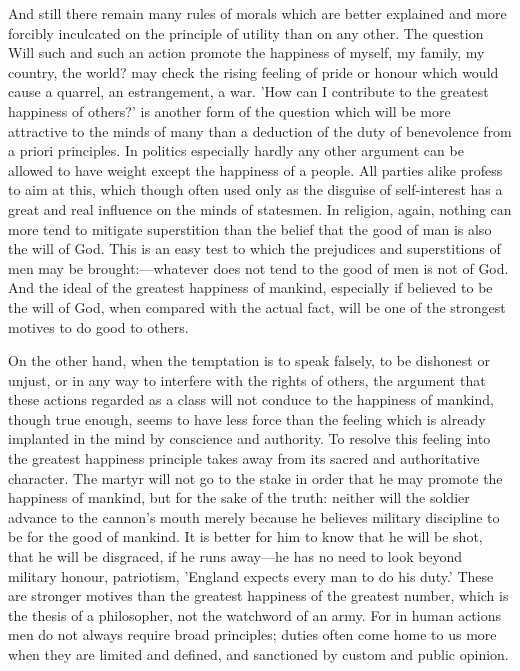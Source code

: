 \documentclass[11pt,letter]{article}
\begin{document}
\par  And still there remain many rules of morals which are better explained and more forcibly inculcated on the principle of utility than on any other. The question Will such and such an action promote the happiness of myself, my family, my country, the world? may check the rising feeling of pride or honour which would cause a quarrel, an estrangement, a war. 'How can I contribute to the greatest happiness of others?' is another form of the question which will be more attractive to the minds of many than a deduction of the duty of benevolence from a priori principles. In politics especially hardly any other argument can be allowed to have weight except the happiness of a people. All parties alike profess to aim at this, which though often used only as the disguise of self-interest has a great and real influence on the minds of statesmen. In religion, again, nothing can more tend to mitigate superstition than the belief that the good of man is also the will of God. This is an easy test to which the prejudices and superstitions of men may be brought:—whatever does not tend to the good of men is not of God. And the ideal of the greatest happiness of mankind, especially if believed to be the will of God, when compared with the actual fact, will be one of the strongest motives to do good to others.

\par  On the other hand, when the temptation is to speak falsely, to be dishonest or unjust, or in any way to interfere with the rights of others, the argument that these actions regarded as a class will not conduce to the happiness of mankind, though true enough, seems to have less force than the feeling which is already implanted in the mind by conscience and authority. To resolve this feeling into the greatest happiness principle takes away from its sacred and authoritative character. The martyr will not go to the stake in order that he may promote the happiness of mankind, but for the sake of the truth: neither will the soldier advance to the cannon's mouth merely because he believes military discipline to be for the good of mankind. It is better for him to know that he will be shot, that he will be disgraced, if he runs away—he has no need to look beyond military honour, patriotism, 'England expects every man to do his duty.' These are stronger motives than the greatest happiness of the greatest number, which is the thesis of a philosopher, not the watchword of an army. For in human actions men do not always require broad principles; duties often come home to us more when they are limited and defined, and sanctioned by custom and public opinion.
\end{document}
